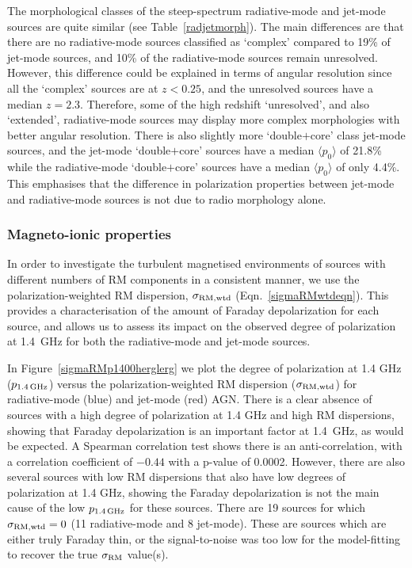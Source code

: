 \documentclass{mnras}
\newcommand*\sigmaRM{\sigma_{\rm RM}}
\newcommand*\sigmaRMwtd{\sigma_{\rm RM, wtd}}
\begin{document}
The morphological classes of the steep-spectrum radiative-mode and jet-mode sources are quite similar (see Table~\ref{radjetmorph}). The main differences are that there are no radiative-mode sources classified as `complex' compared to 19\% of jet-mode sources, and 10\% of the radiative-mode sources remain unresolved. However, this difference could be explained in terms of angular resolution since all the `complex' sources are at $z < 0.25$, and the unresolved sources have a median $z=2.3$. Therefore, some of the high redshift `unresolved', and also `extended', radiative-mode sources may display more complex morphologies with better angular resolution. There is also slightly more `double$+$core' class jet-mode sources, and the jet-mode `double$+$core' sources have a median $\langle p_0 \rangle$ of 21.8\% while the radiative-mode `double$+$core' sources have a median $\langle p_0 \rangle$ of only 4.4\%. This emphasises that the difference in polarization properties between jet-mode and radiative-mode sources is not due to radio morphology alone. 

\subsubsection{Magneto-ionic properties}
In order to investigate the turbulent magnetised environments of sources with different numbers of RM components in a consistent manner, we use the polarization-weighted RM dispersion, $\sigmaRMwtd$ (Eqn.~\ref{sigmaRMwtdeqn}). This provides a characterisation of the amount of Faraday depolarization for each source, and allows us to assess its impact on the observed degree of polarization at 1.4~GHz for both the radiative-mode and jet-mode sources. 

In Figure~\ref{sigmaRMp1400herglerg} we plot the degree of polarization at 1.4 GHz ($p_{\rm 1.4\,GHz}$) versus the polarization-weighted RM dispersion ($\sigmaRMwtd$) for radiative-mode (blue) and jet-mode (red) AGN. There is a clear absence of sources with a high degree of polarization at 1.4 GHz and high RM dispersions, showing that Faraday depolarization is an important factor at 1.4~GHz, as would be expected. A Spearman correlation test shows there is an anti-correlation, with a correlation coefficient of $-0.44$ with a p-value of 0.0002. 
However, there are also several sources with low RM dispersions that also have low degrees of polarization at 1.4 GHz, showing the Faraday depolarization is not the main cause of the low $p_{\rm 1.4\,GHz}$ for these sources. 
There are 19 sources for which $\sigmaRMwtd=0$ (11 radiative-mode and 8 jet-mode). These are sources which are either truly Faraday thin, or the signal-to-noise was too low for the model-fitting to recover the true $\sigmaRM$ value(s). 
\end{document}
